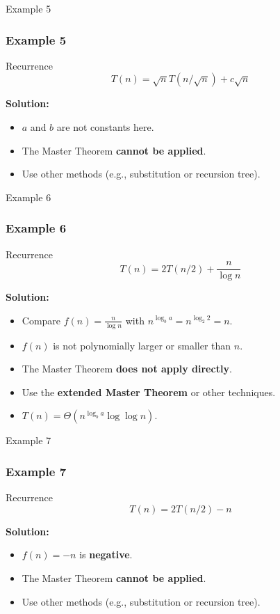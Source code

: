 
\begin{frame}{Example 5}
\frametitle{Example 5}
  \begin{block}{Recurrence}
\[
T(n) = \sqrt{n} T(n/\sqrt{n}) + c\sqrt{n}
\]
  \end{block}

\textbf{Solution:}
\begin{itemize}
    \item \( a \) and \( b \) are not constants here.
    \item The Master Theorem \textbf{cannot be applied}.
    \item Use other methods (e.g., substitution or recursion tree).
\end{itemize}
\end{frame}


\begin{frame}{Example 6}
\frametitle{Example 6}
  \begin{block}{Recurrence}
\[
T(n) = 2T(n/2) + \frac{n}{\log n}
\]
  \end{block}

\textbf{Solution:}
\begin{itemize}
    \item Compare \( f(n) = \frac{n}{\log n} \) with \( n^{\log_b a} = n^{\log_2 2} = n \).
    \item \( f(n) \) is not polynomially larger or smaller than \( n \).
    \item The Master Theorem \textbf{does not apply directly}.
    \item Use the \textbf{extended Master Theorem} or other techniques.
    \item \( T(n) = \Theta(n^{\log_b a} \log \log n) \).
\end{itemize}
\end{frame}


\begin{frame}{Example 7}
\frametitle{Example 7}
  \begin{block}{Recurrence}
\[
T(n) = 2T(n/2) - n
\]
  \end{block}

\textbf{Solution:}
\begin{itemize}
    \item \( f(n) = -n \) is \textbf{negative}.
    \item The Master Theorem \textbf{cannot be applied}.
    \item Use other methods (e.g., substitution or recursion tree).
\end{itemize}
\end{frame}


